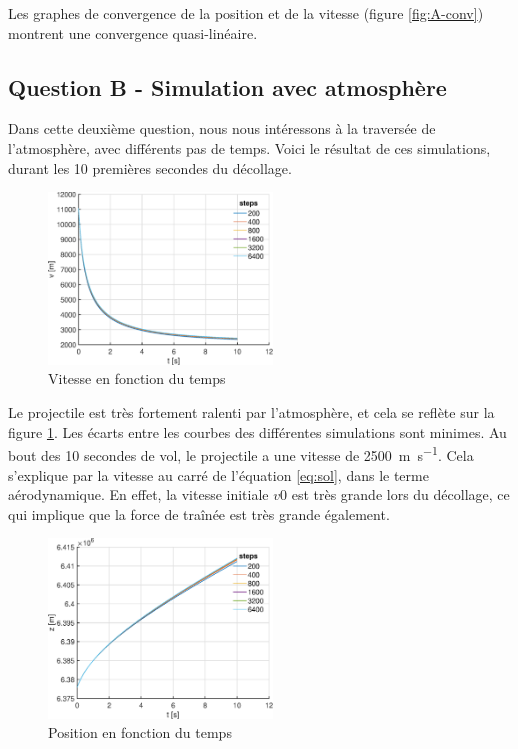 \documentclass[a4paper,12pt,twoside]{article}
\begin{document}
Les graphes de convergence de la position et de la vitesse (figure \ref{fig:A-conv}) montrent une convergence quasi-linéaire. 

\subsection{Question B - Simulation avec atmosphère}
Dans cette deuxième question, nous nous intéressons à la traversée de l'atmosphère, avec différents pas de temps.
Voici le résultat de ces simulations, durant les 10 premières secondes du décollage.\\

\begin{figure}[h]
	\centering
    \includegraphics[width=0.53\textwidth]{graphs/vB.eps}
    \caption{Vitesse en fonction du temps}
    \label{fig:B-vt}
\end{figure}

Le projectile est très fortement ralenti par l'atmosphère, et cela se reflète sur la figure \ref{fig:B-vt}.
Les écarts entre les courbes des différentes simulations sont minimes.
Au bout des 10 secondes de vol, le projectile a une vitesse de \SI{2500}{\meter\per\second}.
Cela s'explique par la vitesse au carré de l'équation \ref{eq:sol}, dans le terme aérodynamique.
En effet, la vitesse initiale $v0$ est très grande lors du décollage, ce qui implique que la force de traînée est très grande également.\\


\begin{figure}[h]
	\centering
	\includegraphics[width=0.53\textwidth]{graphs/zB.eps}
	\caption{Position en fonction du temps}
	\label{fig:B-zt}
\end{figure}
\end{document}
